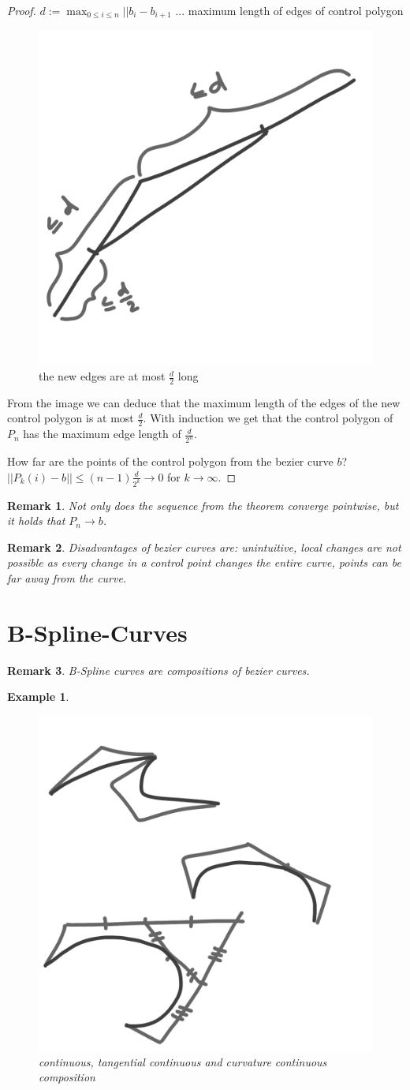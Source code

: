 \documentclass[]{article}
\newtheorem{example}{Example}
\newtheorem{remark}{Remark}
\begin{document}
\begin{proof}
	$d := \max_{0 \leq i \leq n} || b_i - b_{i+1}$ ... maximum length of edges of control polygon
	
	\begin{figure}[h!]
		\centering
		\includegraphics[width=0.3\linewidth]{figures/corner_cutting}
		\caption{the new edges are at most $\frac{d}{2}$ long}
		\label{fig:corner_cutting}
	\end{figure}
	
	From the image we can deduce that the maximum length of the edges of the new control polygon is at most $\frac{d}{2}$. With induction we get that the control polygon of $P_n$ has the maximum edge length of $\frac{d}{2^n}$.
	
	How far are the points of the control polygon from the bezier curve $b$? $||P_k(i) - b|| \leq (n-1) \frac{d}{2^k} \rightarrow 0$ for $k \rightarrow \infty$.
\end{proof}

\begin{remark}
	Not only does the sequence from the theorem converge pointwise, but it holds that $P_n \rightarrow b$.
\end{remark}

\begin{remark}
	Disadvantages of bezier curves are: unintuitive, local changes are not possible as every change in a control point changes the entire curve, points can be far away from the curve.
\end{remark}

\section{B-Spline-Curves}

\begin{remark}
	B-Spline curves are compositions of bezier curves.
\end{remark}

\begin{example}
	\begin{figure}[h!]
		\centering
		\includegraphics[width=0.3\linewidth]{figures/continous_b_spline}
		\caption{continuous, tangential continuous and curvature continuous composition}
		\label{fig:continous_b_spline}
	\end{figure}
\end{example}
\end{document}
